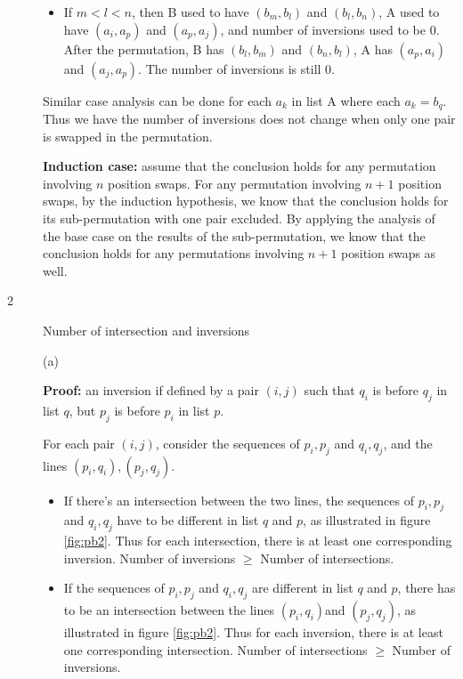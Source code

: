 \documentclass{article}
\begin{document}
\begin{description}
\begin{itemize}
  \item
  If $m < l < n$, then B used to have $(b_m, b_l)$ and $(b_l, b_n)$, A used to have $(a_i, a_p)$ and $(a_p, a_j)$, and number of inversions used to be 0. After the permutation, B has $(b_l, b_m)$ and $(b_n, b_l)$, A has $(a_p, a_i)$ and $(a_j, a_p)$. The number of inversions is still 0.
  \end{itemize}

  Similar case analysis can be done for each $a_k$ in list A where each $a_k = b_q$. Thus we have the number of inversions does not change when only one pair is swapped in the permutation.

  \textbf{Induction case:} assume that the conclusion holds for any permutation involving $n$ position swaps. For any permutation involving $n+1$ position swaps, by the induction hypothesis, we know that the conclusion holds for its sub-permutation with one pair excluded. By applying the analysis of the base case on the results of the sub-permutation, we know that the conclusion holds for any permutations involving $n+1$ position swaps as well.
  

\item[2]{Number of intersection and inversions}

  (a)

  \textbf{Proof:} an inversion if defined by a pair $(i, j)$ such that $q_i$ is before $q_j$ in list $q$, but $p_j$ is before $p_i$ in list $p$. 

  For each pair $(i, j)$, consider the sequences of $p_i, p_j$ and $q_i, q_j$, and the lines $(p_i, q_i), (p_j, q_j)$. 

  \begin{itemize}
  \item
  If there's an intersection between the two lines, the sequences of $p_i, p_j$ and $q_i, q_j$ have to be different in list $q$ and $p$, as illustrated in figure \ref{fig:pb2}. Thus for each intersection, there is at least one corresponding inversion. Number of inversions $\geq$ Number of intersections.

  \item
  If the sequences of $p_i, p_j$ and $q_i, q_j$ are different in list $q$ and $p$, there has to be an intersection between the lines $(p_i, q_i)$and $(p_j, q_j)$, as illustrated in figure \ref{fig:pb2}. Thus for each inversion, there is at least one corresponding intersection. Number of intersections $\geq$ Number of inversions.

  \end{itemize}


\end{description}
\end{document}
